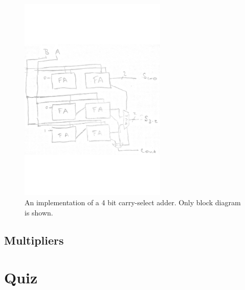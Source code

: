 \documentclass{article}
\begin{document}
\begin{figure}[ht]
  \centering
  \includegraphics[width=7cm]{images/4b-CSA.pdf}
  \caption{An implementation of a 4 bit carry-select adder. Only block diagram is shown.}
  \label{fig:4csa}
\end{figure}

\subsection{Multipliers}

\section{Quiz}
\end{document}
